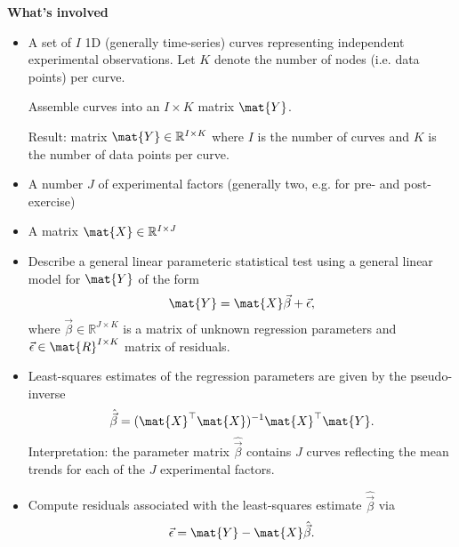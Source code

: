 



    \textbf{What's involved}
    \begin{itemize}
    
        \item A set of $ I $ 1D (generally time-series) curves representing independent experimental observations.
        Let $ K $ denote the number of nodes (i.e. data points) per curve.

        Assemble curves into an $ I \times K $ matrix $ \mat{Y} $.

        Result: matrix $ \mat{Y} \in \mathbb{R}^{I \times K} $ where $ I $ is the number of curves and $ K $ is the number of data points per curve.

        \item A number $ J $ of experimental factors (generally two, e.g. for pre- and post-exercise)

        \item A matrix $ \mat{X} \in \mathbb{R}^{I \times J} $

        \item Describe a general linear parameteric statistical test using a general linear model for $ \mat{Y} $ of the form
        \begin{equation*}
            \mat{Y} = \mat{X} \vec{\beta} + \vec{\epsilon},
        \end{equation*}
        where $ \vec{\beta} \in \mathbb{R}^{J \times K} $ is a matrix of unknown regression parameters and $ \vec{\epsilon} \in \mat{R}^{I \times K} $ matrix of residuals.

        \item Least-squares estimates of the regression parameters are given by the pseudo-inverse
        \begin{equation*}
            \hat{\vec{\beta}} = (\mat{X}^{\top} \mat{X})^{-1} \mat{X}^{\top} \mat{Y}.
        \end{equation*}
        Interpretation: the parameter matrix $ \hat{\vec{\beta}} $ contains $ J $ curves reflecting the mean trends for each of the $ J $ experimental factors.
        
        \item Compute residuals associated with the least-squares estimate $ \hat{\vec{\beta}} $ via
        \begin{equation*}
            \vec{\epsilon} = \mat{Y} - \mat{X} \hat{\vec{\beta}}.
        \end{equation*}
        

\end{itemize}
